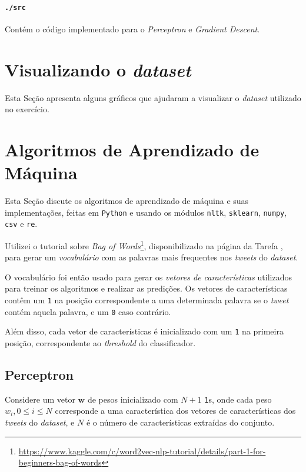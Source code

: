 \documentclass[a4paper, 12pt]{article}
\newcommand{\rom}[1]{\uppercase\expandafter{\romannumeral #1\relax}}
\begin{document}
\paragraph{\texttt{./src}} Contém o código implementado
para o \textit{Perceptron} e \textit{Gradient Descent}.

\section{Visualizando o \textit{dataset}} \label{sec:viz}

Esta Seção apresenta alguns gráficos que ajudaram a visualizar
o \textit{dataset} utilizado no exercício.

\section{Algoritmos de Aprendizado de Máquina}

Esta Seção discute os algoritmos de aprendizado de máquina
e suas implementações, feitas em \texttt{Python} e usando os
módulos \texttt{nltk}, \texttt{sklearn}, \texttt{numpy},
\texttt{csv} e \texttt{re}.

Utilizei o tutorial sobre \textit{Bag of
Words}\footnote{\url{https://www.kaggle.com/c/word2vec-nlp-tutorial/details/part-1-for-beginners-bag-of-words}},
disponibilizado na página da Tarefa \rom{1}, para gerar um \textit{vocabulário}
com as palavras mais frequentes nos \textit{tweets} do \textit{dataset}.

O vocabulário foi então usado para gerar os \textit{vetores de características}
utilizados para treinar os algoritmos e realizar as predições.
Os vetores de características contêm um \texttt{1} na posição
correspondente a uma determinada palavra se o \textit{tweet}
contém aquela palavra, e um \texttt{0} caso contrário.

Além disso, cada vetor de características é inicializado com
um \texttt{1} na primeira posição, correspondente ao
\textit{threshold} do classificador.

\subsection{Perceptron} \label{sec:percep}

Considere um vetor $\boldsymbol{w}$ de pesos inicializado com $N + 1$
\texttt{1}s, onde cada peso $w_i, 0 \leq i \leq N$ corresponde a uma
característica dos vetores de características dos \textit{tweets} do
\textit{dataset}, e $N$ é o número de características extraídas do conjunto.
\end{document}
